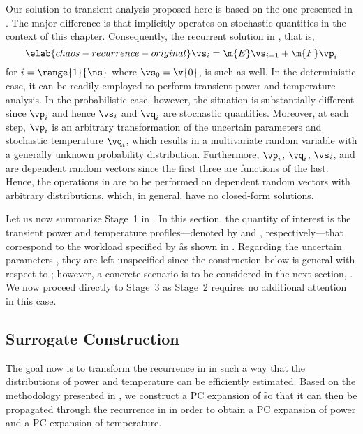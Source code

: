 Our solution to transient analysis proposed here is based on the one presented
in . The major difference is that
 implicitly operates on stochastic quantities in the
context of this chapter. Consequently, the recurrent solution in
, that is,
\begin{equation} \elab{chaos-recurrence-original}
  \vs_i = \m{E} \vs_{i - 1} + \m{F} \vp_i
\end{equation}
for $i = \range{1}{\ns}$ where $\vs_0 = \v{0}$, is such as well. In the
deterministic case, it can be readily employed to perform transient power and
temperature analysis. In the probabilistic case, however, the situation is
substantially different since $\vp_i$ and hence $\vs_i$ and $\vq_i$ are
stochastic quantities. Moreover, at each step, $\vp_i$ is an arbitrary
transformation of the uncertain parameters \vu and stochastic temperature
$\vq_i$, which results in a multivariate random variable with a generally
unknown probability distribution. Furthermore, $\vp_i$, $\vq_i$, $\vs_i$, and
\vu are dependent random vectors since the first three are functions of the
last. Hence, the operations in  are to be
performed on dependent random vectors with arbitrary distributions, which, in
general, have no closed-form solutions.

Let us now summarize Stage~1 in . In this section, the
quantity of interest \g is the transient power and temperature
profiles---denoted by \mp and \mq, respectively---that correspond to the
workload specified by \f as shown in . Regarding the
uncertain parameters \vu, they are left unspecified since the construction below
is general with respect to \vu; however, a concrete scenario is to be considered
in the next section, . We now proceed directly
to Stage~3 as Stage~2 requires no additional attention in this case.

\subsection{Surrogate Construction}

The goal now is to transform the recurrence in 
in such a way that the distributions of power and temperature can be efficiently
estimated. Based on the methodology presented in
, we construct a \ac{PC} expansion of \f so
that it can then be propagated through the recurrence in
 in order to obtain a \ac{PC} expansion of power
and a \ac{PC} expansion of temperature.

